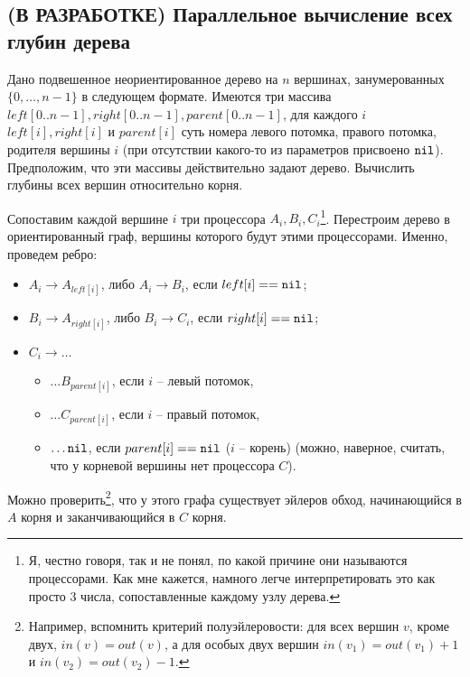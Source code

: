 \subsection{(В РАЗРАБОТКЕ) Параллельное вычисление всех глубин дерева}
\begin{problem*}
	Дано подвешенное неориентированное дерево на $n$ вершинах, занумерованных $\{0,\ldots,n-1\}$ в следующем формате. Имеются три массива $left[0..n-1], right[0..n-1], parent[0..n-1]$, для каждого $i$ $left[i], right[i] \text{ и } parent[i]$ суть номера левого потомка, правого потомка, родителя вершины $i$ (при отсутствии какого-то из параметров присвоено $\mathtt{nil}$). Предположим, что эти массивы действительно задают дерево. Вычислить глубины всех вершин относительно корня.
\end{problem*}
 Сопоставим каждой вершине $i$ три процессора $A_i, B_i, C_i$\footnote{Я, честно говоря, так и не понял, по какой причине они называются процессорами. Как мне кажется, намного легче интерпретировать это как просто 3 числа, сопоставленные каждому узлу дерева.}. Перестроим дерево в ориентированный граф, вершины которого будут этими процессорами. Именно, проведем ребро:
\begin{itemize}
	\item $A_i \rightarrow A_{left[i]}$, либо $A_i \rightarrow B_i$, если $left[i] == \mathtt{nil}$;
	\item $B_i \rightarrow A_{right[i]}$, либо $B_i \rightarrow C_i$, если $right[i] == \mathtt{nil}$;
	\item $C_i \rightarrow \ldots$
	\begin{itemize}
		\item $\ldots B_{parent[i]}$, если $i$ -- левый потомок,
		\item $\ldots C_{parent[i]}$, если $i$ -- правый потомок,
		\item $\ldots \mathtt{nil}$, если $parent[i] == \mathtt{nil}$ ($i$ -- корень) (можно, наверное, считать, что у корневой вершины нет процессора $C$).
	\end{itemize}
\end{itemize}

Можно проверить\footnote{Например, вспомнить критерий полуэйлеровости: для всех вершин $v$, кроме двух, $in(v) = out(v)$, а для особых двух вершин $in(v_1) = out(v_1) + 1$ и $in(v_2) = out(v_2) - 1$.}, что у этого графа существует эйлеров обход, начинающийся в $A$ корня и заканчивающийся в $C$ корня.

